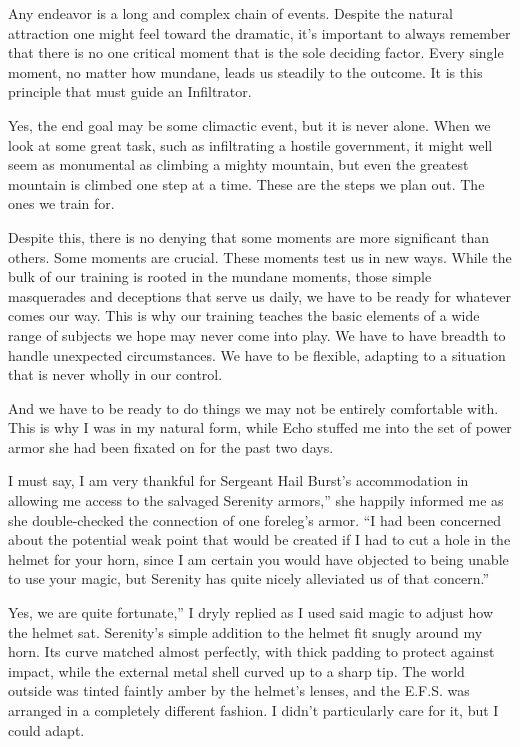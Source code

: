 Any endeavor is a long and complex chain of events. Despite the natural attraction one might feel toward the dramatic, it’s important to always remember that there is no one critical moment that is the sole deciding factor. Every single moment, no matter how mundane, leads us steadily to the outcome. It is this principle that must guide an Infiltrator.

Yes, the end goal may be some climactic event, but it is never alone. When we look at some great task, such as infiltrating a hostile government, it might well seem as monumental as climbing a mighty mountain, but even the greatest mountain is climbed one step at a time. These are the steps we plan out. The ones we train for.

Despite this, there is no denying that some moments are more significant than others. Some moments are crucial. These moments test us in new ways. While the bulk of our training is rooted in the mundane moments, those simple masquerades and deceptions that serve us daily, we have to be ready for whatever comes our way. This is why our training teaches the basic elements of a wide range of subjects we hope may never come into play. We have to have breadth to handle unexpected circumstances. We have to be flexible, adapting to a situation that is never wholly in our control.

And we have to be ready to do things we may not be entirely comfortable with. This is why I was in my natural form, while Echo stuffed me into the set of power armor she had been fixated on for the past two days.

\leavevmode{}I must say, I am very thankful for Sergeant Hail Burst’s accommodation in allowing me access to the salvaged Serenity armors,” she happily informed me as she double-checked the connection of one foreleg’s armor. “I had been concerned about the potential weak point that would be created if I had to cut a hole in the helmet for your horn, since I am certain you would have objected to being unable to use your magic, but Serenity has quite nicely alleviated us of that concern.”

\leavevmode{}Yes, we are quite fortunate,” I dryly replied as I used said magic to adjust how the helmet sat. Serenity’s simple addition to the helmet fit snugly around my horn. Its curve matched almost perfectly, with thick padding to protect against impact, while the external metal shell curved up to a sharp tip. The world outside was tinted faintly amber by the helmet’s lenses, and the E.F.S. was arranged in a completely different fashion. I didn’t particularly care for it, but I could adapt.

